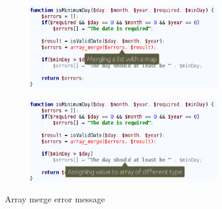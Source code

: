 \begin{figure}
\centering
\begin{subfigure}{\textwidth}
\centering
\includegraphics[width=0.9\textwidth]{chapters/caseStudy/newScreens/validateDay}
\end{subfigure}
\begin{subfigure}{\textwidth}
\centering
\includegraphics[width=0.9\textwidth]{chapters/caseStudy/newScreens/validateDay2}
\end{subfigure}
\caption{Array merge error message}
\label{fig:dateScreenshot}
\end{figure}
